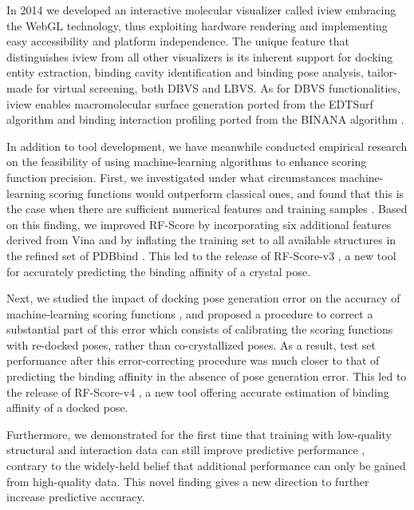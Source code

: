 \documentclass[a4paper,12pt]{article}
\begin{document}
In 2014 we developed an interactive molecular visualizer called iview \citep{1366,1265} embracing the WebGL technology, thus exploiting hardware rendering and implementing easy accessibility and platform independence. The unique feature that distinguishes iview from all other visualizers is its inherent support for docking entity extraction, binding cavity identification and binding pose analysis, tailor-made for virtual screening, both DBVS and LBVS. As for DBVS functionalities, iview enables macromolecular surface generation ported from the EDTSurf algorithm \citep{1297} and binding interaction profiling ported from the BINANA algorithm \citep{1413}.

In addition to tool development, we have meanwhile conducted empirical research on the feasibility of using machine-learning algorithms to enhance scoring function precision. First, we investigated under what circumstances machine-learning scoring functions would outperform classical ones, and found that this is the case when there are sufficient numerical features and training samples \citep{1432}. Based on this finding, we improved RF-Score by incorporating six additional features derived from Vina and by inflating the training set to all available structures in the refined set of PDBbind \citep{1633}. This led to the release of RF-Score-v3 \citep{1647}, a new tool for accurately predicting the binding affinity of a crystal pose.

Next, we studied the impact of docking pose generation error on the accuracy of machine-learning scoring functions \citep{1795,1797,1434}, and proposed a procedure to correct a substantial part of this error which consists of calibrating the scoring functions with re-docked poses, rather than co-crystallized poses. As a result, test set performance after this error-correcting procedure was much closer to that of predicting the binding affinity in the absence of pose generation error. This led to the release of RF-Score-v4 \citep{1795}, a new tool offering accurate estimation of binding affinity of a docked pose.

Furthermore, we demonstrated for the first time that training with low-quality structural and interaction data can still improve predictive performance \citep{1663}, contrary to the widely-held belief that additional performance can only be gained from high-quality data. This novel finding gives a new direction to further increase predictive accuracy.
\end{document}
